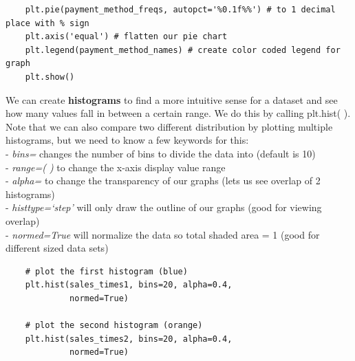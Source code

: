 \documentclass[11pt, a4paper]{article}
\begin{document}
\begin{spacing}{1.1}
\begin{lstlisting}
	plt.pie(payment_method_freqs, autopct='%0.1f%%') # to 1 decimal place with % sign
	plt.axis('equal') # flatten our pie chart
	plt.legend(payment_method_names) # create color coded legend for graph
	plt.show() \end{lstlisting}\vspace*{1mm}
	We can create \textbf{histograms} to find a more intuitive sense for a dataset and see how many values fall in between a certain range. We do this by calling plt.hist( ). Note that we can also compare two different distribution by plotting multiple histograms, but we need to know a few keywords for this: \\
	\hspace*{3mm} - \textit{bins=} changes the number of bins to divide the data into (default is 10) \\
	\hspace*{3mm} - \textit{range=( )} to change the x-axis display value range \\
	\hspace*{3mm} - \textit{alpha=} to change the transparency of our graphs (lets us see overlap of 2 histograms) \\
	\hspace*{3mm} - \textit{histtype=`step'} will only draw the outline of our graphs (good for viewing overlap) \\
	\hspace*{3mm} - \textit{normed=True} will normalize the data so total shaded area = 1 (good for different sized data sets)
	\begin{minipage}[c]{9cm}
	\begin{lstlisting}
	# plot the first histogram (blue)
	plt.hist(sales_times1, bins=20, alpha=0.4, 
	         normed=True)
	
	# plot the second histogram (orange)
	plt.hist(sales_times2, bins=20, alpha=0.4, 
	         normed=True)
	

\end{lstlisting}
\end{minipage}
\end{spacing}
\end{document}
